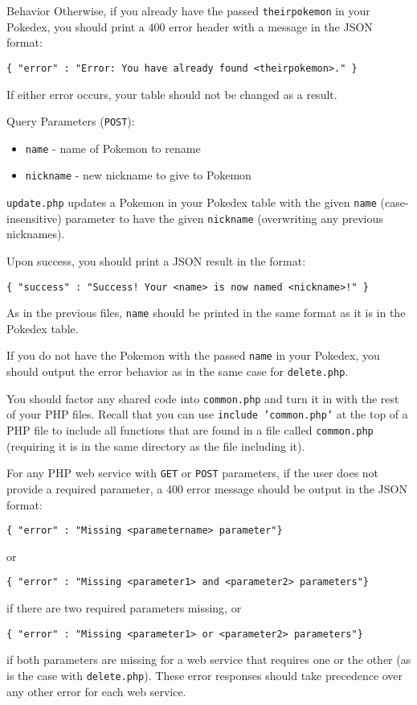 \documentclass[programming]{../../../../mfcs}
\begin{document}
\begin{question}{Behavior}
  Otherwise, if you already have the passed \texttt{theirpokemon} in your Pokedex, you should print
  a 400 error header with a message in the JSON format: 
  \begin{verbatim}
{ "error" : "Error: You have already found <theirpokemon>." }\end{verbatim}

  If either error occurs, your table should not be changed as a result.

  Query Parameters (\texttt{POST}):
  \begin{itemize}
    \item \texttt{name} - name of Pokemon to rename
    \item \texttt{nickname} - new nickname to give to Pokemon
  \end{itemize}
  \texttt{update.php} updates a Pokemon in your Pokedex table with the given \texttt{name}
  (case-insensitive) 
  parameter to have the given \texttt{nickname} (overwriting any previous nicknames). 
  \newline

  Upon success, you should print a JSON result in the format: 
  \begin{verbatim}
{ "success" : "Success! Your <name> is now named <nickname>!" }\end{verbatim}
  As in the previous files, \texttt{name} should be printed in the same format as it is
  in the Pokedex table.
  \newline

  If you do not have the Pokemon with the passed \texttt{name} in your Pokedex, you should output
  the error behavior as in the same case for \texttt{delete.php}.

  You should factor any shared code into \texttt{common.php} and turn it in with the rest of your
  PHP files. Recall that you can use \texttt{include 'common.php'} at the top of a PHP file to
  include all functions that are found in a file called \texttt{common.php} (requiring it is in the
  same directory as the file including it).
  \newline

  For any PHP web service with \texttt{GET} or \texttt{POST} parameters, if the user does not
  provide a required parameter, a 400 error message should be output in the JSON format:
  \begin{verbatim}
{ "error" : "Missing <parametername> parameter"}\end{verbatim}
or
  \begin{verbatim}
{ "error" : "Missing <parameter1> and <parameter2> parameters"}\end{verbatim}
if there are two required parameters missing, or
  \begin{verbatim}
{ "error" : "Missing <parameter1> or <parameter2> parameters"}\end{verbatim}
if both parameters are missing for a web service that requires one or the other (as is the case with
\texttt{delete.php}). These error responses should take precedence over any other error for each web service.


\end{question}
\end{document}

